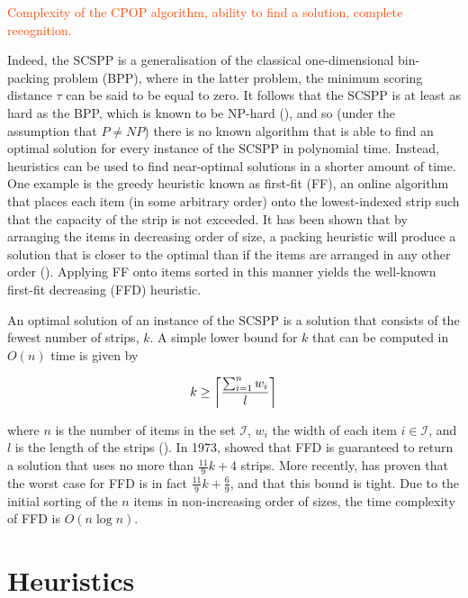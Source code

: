 \documentclass[oribibl]{llncs}
\begin{document}
\textcolor{OrangeRed}{Complexity of the CPOP algorithm, ability to find a solution, complete recognition.}


Indeed, the SCSPP is a generalisation of the classical one-dimensional bin-packing problem (BPP), where in the latter problem, the minimum scoring distance $\tau$ can be said to be equal to zero. It follows that the SCSPP is at least as hard as the BPP, which is known to be NP-hard (\citealp{garey1979}), and so (under the assumption that $P \neq NP$) there is no known algorithm that is able to find an optimal solution for every instance of the SCSPP in polynomial time. Instead, heuristics can be used to find near-optimal solutions in a shorter amount of time. One example is the greedy heuristic known as first-fit (FF), an online algorithm that places each item (in some arbitrary order) onto the lowest-indexed strip such that the capacity of the strip is not exceeded. It has been shown that by arranging the items in decreasing order of size, a packing heuristic will produce a solution that is closer to the optimal than if the items are arranged in any other order (\citealp{johnson1974fast}). Applying FF onto items sorted in this manner yields the well-known first-fit decreasing (FFD) heuristic.

An optimal solution of an instance of the SCSPP is a solution that consists of the fewest number of strips, $k$. A simple lower bound for $k$ that can be computed in $O(n)$ time is given by

\begin{equation}
	k \geq \ceil*{\frac{\sum_{i=1}^{n}w_i}{l}}
\end{equation}

where $n$ is the number of items in the set $\mathcal{I}$, $w_i$ the width of each item $i \in \mathcal{I}$, and $l$ is the length of the strips (\citealp{martello1990b}). In 1973, \citeauthor{johnson1973} showed that FFD is guaranteed to return a solution that uses no more than $\frac{11}{9}k + 4$ strips. More recently, \cite{dosa2007} has proven that the worst case for FFD is in fact $\frac{11}{9}k + \frac{6}{9}$, and that this bound is tight. Due to the initial sorting of the $n$ items in non-increasing order of sizes, the time complexity of FFD is $O(n\log n)$.


\section{Heuristics}
\end{document}
